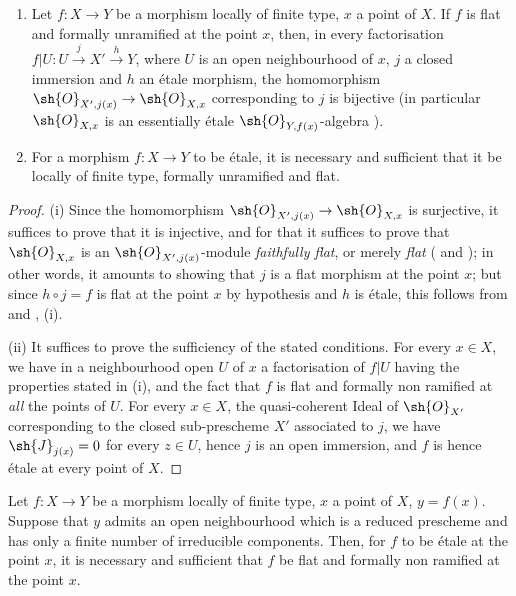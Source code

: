 \begin{corollary}[18.4.12]
\label{IV.18.4.12}
\begin{enumerate}
  \item[(i)] Let $f:X\to Y$ be a morphism locally of finite type, $x$ a point of $X$.
If $f$ is flat and formally unramified at the point $x$, then, in every factorisation $f|U:U\xrightarrow{j}X'\xrightarrow{h}Y$, where $U$ is an open neighbourhood of $x$, $j$ a closed immersion and $h$ an \'etale morphism, the homomorphism $\sh{O}_{X',j(x)}\to\sh{O}_{X,x}$ corresponding to $j$ is bijective (in particular $\sh{O}_{X,x}$ is an essentially \'etale $\sh{O}_{Y,f(x)}$-algebra ).
  \item[(ii)] For a morphism $f:X\to Y$ to be \'etale, it is necessary and sufficient that it be locally of finite type, formally unramified and flat.
\end{enumerate}
\end{corollary}

\begin{proof}
(i) Since the homomorphism $\sh{O}_{X',j(x)}\to\sh{O}_{X,x}$ is surjective, it suffices to prove that it is injective, and for that it suffices to prove that $\sh{O}_{X,x}$ is an $\sh{O}_{X',j(x)}$-module \emph{faithfully flat}, or merely \emph{flat} ( and );
in other words, it amounts to showing that $j$ is a flat morphism at the point $x$;
but since $h\circ j=f$ is flat at the point $x$ by hypothesis and $h$ is \'etale, this follows from  and , (i).

(ii) It suffices to prove the sufficiency of the stated conditions.
For every $x\in X$, we have in a neighbourhood open $U$ of $x$ a factorisation of $f|U$ having the properties stated in (i), and the fact that $f$ is flat and formally non ramified at \emph{all} the points of $U$.
For every $x\in X$, the quasi-coherent Ideal of $\sh{O}_{X'}$ corresponding to the closed sub-prescheme $X'$ associated to $j$, we have $\sh{J}_{j(x)}=0$ for every $z\in U$, hence $j$ is an open immersion, and $f$ is hence \'etale at every point of $X$.
\end{proof}

\begin{corollary}[18.4.13]
\label{IV.18.4.13}
Let $f:X\to Y$ be a morphism locally of finite type, $x$ a point of $X$, $y=f(x)$.
Suppose that $y$ admits an open neighbourhood which is a reduced prescheme and has only a finite number of irreducible components.
Then, for $f$ to be \'etale at the point $x$, it is necessary and sufficient that $f$ be flat and formally non ramified at the point $x$.
\end{corollary}

